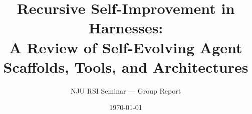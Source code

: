 \documentclass[11pt,letterpaper]{article}
\title{Recursive Self-Improvement in Harnesses:\\
       \large A Review of Self-Evolving Agent Scaffolds, Tools, and Architectures}
\author{NJU RSI Seminar --- Group Report}
\date{\today}
\begin{document}
\maketitle

\begin{abstract}

\end{abstract}










\end{document}
